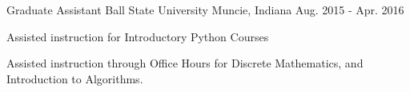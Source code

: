 \begin{cventries}
  \cventry
    {Graduate Assistant} %
    {Ball State University} %
    {Muncie, Indiana} %
    {Aug. 2015 - Apr. 2016} %
    {
      \begin{cvitems} %
        \item {Assisted instruction for Introductory Python Courses}
        \item {Assisted instruction through Office Hours for Discrete Mathematics, and Introduction to Algorithms.}
      \end{cvitems}
    }

\end{cventries}
